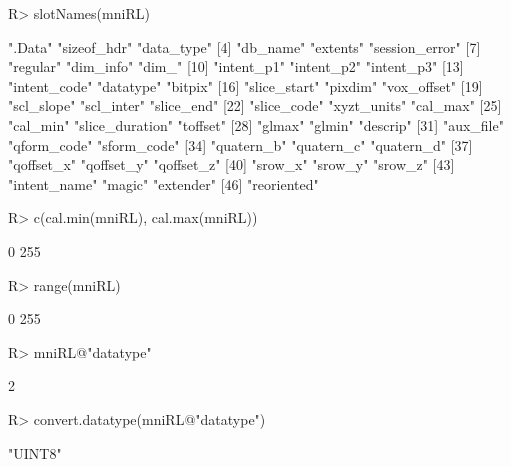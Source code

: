\documentclass[
]{article}
\begin{document}
\begin{CodeChunk}

\begin{CodeInput}
R> slotNames(mniRL)
\end{CodeInput}

\begin{CodeOutput}
 [1] ".Data"          "sizeof_hdr"     "data_type"     
 [4] "db_name"        "extents"        "session_error" 
 [7] "regular"        "dim_info"       "dim_"          
[10] "intent_p1"      "intent_p2"      "intent_p3"     
[13] "intent_code"    "datatype"       "bitpix"        
[16] "slice_start"    "pixdim"         "vox_offset"    
[19] "scl_slope"      "scl_inter"      "slice_end"     
[22] "slice_code"     "xyzt_units"     "cal_max"       
[25] "cal_min"        "slice_duration" "toffset"       
[28] "glmax"          "glmin"          "descrip"       
[31] "aux_file"       "qform_code"     "sform_code"    
[34] "quatern_b"      "quatern_c"      "quatern_d"     
[37] "qoffset_x"      "qoffset_y"      "qoffset_z"     
[40] "srow_x"         "srow_y"         "srow_z"        
[43] "intent_name"    "magic"          "extender"      
[46] "reoriented"    
\end{CodeOutput}

\begin{CodeInput}
R> c(cal.min(mniRL), cal.max(mniRL))
\end{CodeInput}

\begin{CodeOutput}
[1]   0 255
\end{CodeOutput}

\begin{CodeInput}
R> range(mniRL)
\end{CodeInput}

\begin{CodeOutput}
[1]   0 255
\end{CodeOutput}

\begin{CodeInput}
R> mniRL@"datatype"
\end{CodeInput}

\begin{CodeOutput}
[1] 2
\end{CodeOutput}

\begin{CodeInput}
R> convert.datatype(mniRL@"datatype")
\end{CodeInput}

\begin{CodeOutput}
[1] "UINT8"
\end{CodeOutput}
\end{CodeChunk}
\end{document}
